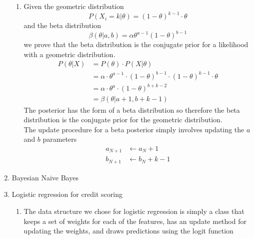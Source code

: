 \documentclass{article}
\begin{document}
\begin{enumerate}
\begin{enumerate}
            \item %
                Given the geometric distribution
                \begin{equation*}
                    P(X_i=k|\theta)= (1-\theta)^{k-1} \cdot \theta
                \end{equation*}
                and the beta distribution
                \begin{equation*}
                    \beta(\theta|a,b)= \alpha \theta^{a-1} (1-\theta)^{b-1}
                \end{equation*}
                we prove that the beta distribution is the conjugate prior
                for a likelihood with a geometric distribution.
                \begin{align*}
                    P(\theta|X)
                    &= P(\theta) \cdot P(X|\theta) \\
                    &= \alpha \cdot \theta^{a-1} \cdot (1-\theta)^{b-1} 
                        \cdot (1-\theta)^{k-1} \cdot \theta \\
                    &= \alpha \cdot \theta^{a} \cdot (1-\theta)^{b+k-2} \\
                    &= \beta(\theta|a+1, b+k-1) 
                \end{align*}
                The posterior has the form of a beta distribution so
                therefore the beta distribution is the conjugate prior for
                the geometric distribution. \\
                The update procedure for a beta posterior simply involves
                updating the \(a\) and \(b\) parameters
                \begin{align*}
                    a_{N+1} &\leftarrow a_N + 1 \\
                    b_{N+1} &\leftarrow b_N + k - 1
                \end{align*}
        \end{enumerate}
    \item Bayesian Naive Bayes %
    \item Logistic regression for credit scoring %
        \begin{enumerate}
            \item %
                The data structure we chose for logistic regression is
                simply a class that keeps a set of weights for each of the
                features, has an update method for updating the weights,
                and draws predictions using the logit function

\end{enumerate}
\end{enumerate}
\end{document}
